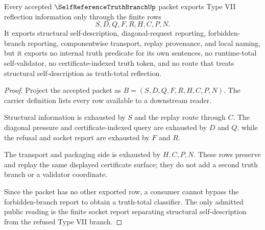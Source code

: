 \begin{theorem}
\label{thm:self-reference-truth-branch-nonescape}
Every accepted $\SelfReferenceTruthBranchUp$ packet exports Type VII reflection information only through the finite rows
$$
S,D,Q,F,R,H,C,P,N.
$$
It exports structural self-description, diagonal-request reporting, forbidden-branch reporting, componentwise transport, replay provenance, and local naming, but it exports no internal truth predicate for its own sentences, no runtime-total self-validator, no certificate-indexed truth token, and no route that treats structural self-description as truth-total reflection.
\end{theorem}
\begin{proof}
Project the accepted packet as $B=(S,D,Q,F,R,H,C,P,N)$. The carrier definition lists every row available to a downstream reader.

Structural information is exhausted by $S$ and the replay route through $C$. The diagonal pressure and certificate-indexed query are exhausted by $D$ and $Q$, while the refusal and socket report are exhausted by $F$ and $R$.

The transport and packaging side is exhausted by $H,C,P,N$. These rows preserve and replay the same displayed certificate surface; they do not add a second truth branch or a validator coordinate.

Since the packet has no other exported row, a consumer cannot bypass the forbidden-branch report to obtain a truth-total classifier. The only admitted public reading is the finite socket report separating structural self-description from the refused Type VII branch.
\end{proof}


\begin{closurestatus}{\SelfReferenceTruthBranchUp}
  \theoryclosure{\seedClosure}
  \formalstatus{\unformalizedV}
\end{closurestatus}
